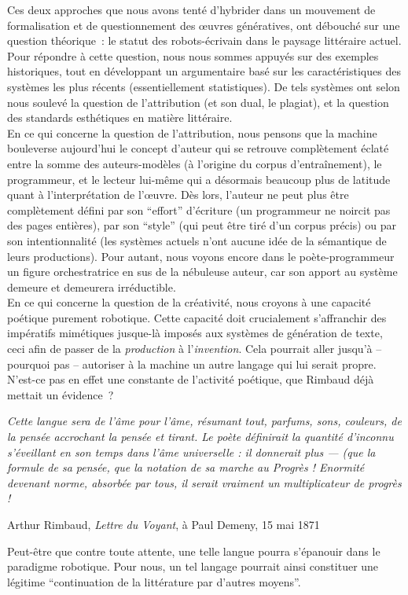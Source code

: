 \documentclass{article}
\newenvironment{citationbox}
{\begin{center}
		\begin{minipage}{.8\textwidth}
		}
		{
		\end{minipage}	
\end{center}
}
\begin{document}
		Ces deux approches que nous avons tenté d'hybrider dans un mouvement de formalisation et de questionnement des œuvres génératives, ont débouché sur une question théorique~: le statut des robots-écrivain dans le paysage littéraire actuel. Pour répondre à cette question, nous nous sommes appuyés sur des exemples historiques, tout en développant un argumentaire basé sur les caractéristiques des systèmes les plus récents (essentiellement statistiques). De tels systèmes ont selon nous soulevé la question de l'attribution (et son dual, le plagiat), et la question des standards esthétiques en matière littéraire.\\
		En ce qui concerne la question de l'attribution, nous pensons que la machine bouleverse aujourd'hui le concept d'auteur qui se retrouve complètement éclaté entre la somme des auteurs-modèles (à l'origine du corpus d'entraînement), le programmeur, et le lecteur lui-même qui a désormais beaucoup plus de latitude quant à l'interprétation de l'œuvre. Dès lors, l'auteur ne peut plus être complètement défini par son ``effort'' d'écriture (un programmeur ne noircit pas des pages entières), par son ``style'' (qui peut être tiré d'un corpus précis) ou par son intentionnalité (les systèmes actuels n'ont aucune idée de la sémantique de leurs productions). Pour autant, nous voyons encore dans le poète-programmeur un figure orchestratrice en sus de la nébuleuse auteur, car son apport au système demeure et demeurera irréductible.\\
		En ce qui concerne la question de la créativité, nous croyons à une capacité poétique purement robotique. Cette capacité doit crucialement s'affranchir des impératifs mimétiques jusque-là imposés aux systèmes de génération de texte, ceci afin de passer de la \textit{production} à l'\textit{invention}. Cela pourrait aller jusqu'à -- pourquoi pas -- autoriser à la machine un autre langage qui lui serait propre. N'est-ce pas en effet une constante de l'activité poétique, que Rimbaud déjà mettait un évidence~?
		\begin{citationbox}
			\textit{Cette langue sera de l’âme pour l’âme, résumant tout, parfums, sons, couleurs, de la pensée accrochant la pensée et tirant. Le poète définirait la quantité d’inconnu s’éveillant en son temps dans l’âme universelle : il donnerait plus — (que la formule de sa pensée, que la notation de sa marche au Progrès ! Enormité devenant norme, absorbée par tous, il serait vraiment un multiplicateur de progrès !}\begin{flushright}
				Arthur Rimbaud, \textit{Lettre du Voyant}, à Paul Demeny, 15 mai 1871
			\end{flushright}
		\end{citationbox}
		Peut-être que contre toute attente, une telle langue pourra s'épanouir dans le paradigme robotique. Pour nous, un tel langage pourrait ainsi constituer une légitime ``continuation de la littérature par d'autres moyens''.
	\newpage
\end{document}
